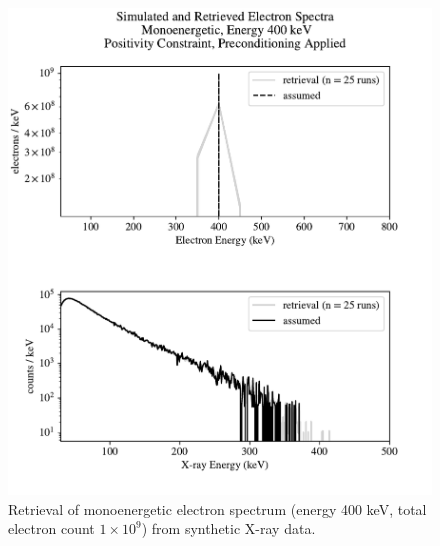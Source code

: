 \begin{figure}[p]
    \centering
    \includegraphics[width=\textwidth]{figures/chapter_4/synthetic_data_examples/mono_400keV_posonly_preconditioning_1e9_particles}
    \caption{Retrieval of monoenergetic electron spectrum (energy 400 keV, total electron count $1\times10^9$) from synthetic X-ray data.}
    \label{why_non_negative_is_good}
\end{figure}

